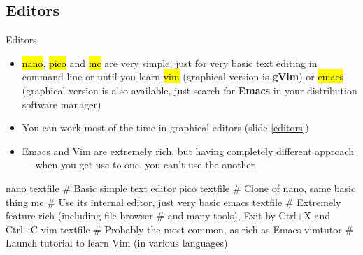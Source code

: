 \documentclass[compress, ucs, xelatex, 11pt, xcolor=svgnames,
  hyperref={
    bookmarks=true,
    unicode=true,
    colorlinks=true,
    pdftitle={Linux, command line and MetaCentrum},
    plainpages=false,
    pdfauthor={Vojtech Zeisek},
    pdfsubject={Course about use of Linux command line, writing shell scripts and using MetaCentrum of CESNET},
    pdfcreator={XeLaTeX, http://www.xelatex.org/},
    pdfkeywords={Linux, GNU, BASH, shell, command line, MetaCentrum},
    linkcolor=Sienna,
    anchorcolor=black,
    citecolor=green,
    filecolor=magenta,
    menucolor=Sienna,
    urlcolor=cyan,
    pdftex},
  url={hyphens, lowtilde} %
  ]{beamer}
\renewcommand{\texttt}[1]{\hl{\ttfamily #1}}
\begin{document}
\subsection{Editors} 

\begin{frame}[fragile]{Editors}
\begin{itemize}
 \item \texttt{nano}, \texttt{pico} and \texttt{mc} are very simple, just for very basic text editing in command line or until you learn \texttt{vim} (graphical version is \textbf{gVim}) or \texttt{emacs} (graphical version is also available, just search for \textbf{Emacs} in your distribution software manager)
 \item You can work most of the time in graphical editors (slide \ref{editors})
 \item Emacs and Vim are extremely rich, but having completely different approach --- when you get use to one, you can't use the another
\end{itemize}
  \begin{bashcode}
    nano textfile # Basic simple text editor
    pico textfile # Clone of nano, same basic thing
    mc # Use its internal editor, just very basic
    emacs textfile # Extremely feature rich (including file browser
                   # and many tools), Exit by Ctrl+X and Ctrl+C
    vim textfile # Probably the most common, as rich as Emacs
    vimtutor # Launch tutorial to learn Vim (in various languages)
   \end{bashcode}
\end{frame}
\end{document}
